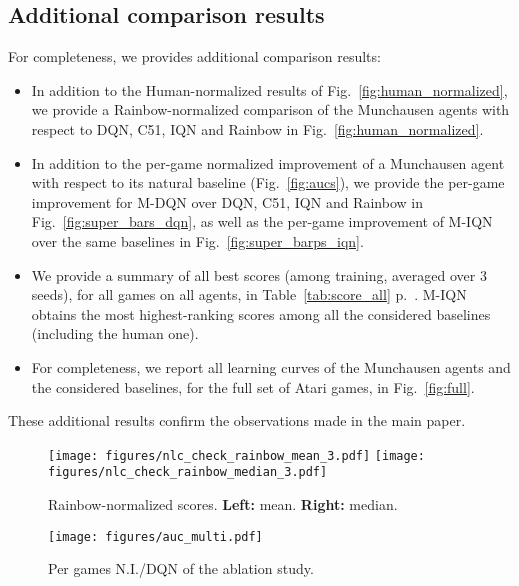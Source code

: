 \documentclass{article}
\begin{document}
\subsection{Additional comparison results}
\label{subappx:metrics}

For completeness, we provides additional comparison results:
\begin{itemize}
    \item In addition to the Human-normalized results of Fig.~\ref{fig:human_normalized}, we provide a Rainbow-normalized comparison of the Munchausen agents with respect to DQN, C51, IQN and Rainbow in Fig.~\ref{fig:human_normalized}.
    \item In addition to the per-game normalized improvement of a Munchausen agent with respect to its natural baseline (Fig.~\ref{fig:aucs}), we provide the per-game improvement for M-DQN over DQN, C51, IQN and Rainbow in Fig.~\ref{fig:super_bars_dqn}, as well as the per-game improvement of M-IQN over the same baselines in Fig.~\ref{fig:super_barps_iqn}.
    \item We provide a summary of all best scores (among training, averaged over 3 seeds), for all games on all agents, in Table~\ref{tab:score_all} p.~\pageref{tab:score_all}. M-IQN obtains the most highest-ranking scores among all the considered baselines (including the human one).
    \item For completeness, we report all learning curves of the Munchausen agents and the considered baselines, for the full set of Atari games, in Fig.~\ref{fig:full}.
\end{itemize}
These additional results confirm the observations made in the main paper.


\begin{figure}
    \centering
    \texttt{[image: figures/nlc\_check\_rainbow\_mean\_3.pdf]}
    \texttt{[image: figures/nlc\_check\_rainbow\_median\_3.pdf]}
    \caption{Rainbow-normalized scores. \textbf{Left:} mean. \textbf{Right:} median.}
    \label{fig:rainbow_normalized}
\end{figure}








\begin{figure}
    \centering
    \texttt{[image: figures/auc\_multi.pdf]}
    \caption{Per games N.I./DQN of the ablation study.}
    \label{fig:auc_multi}
\end{figure}
\end{document}
